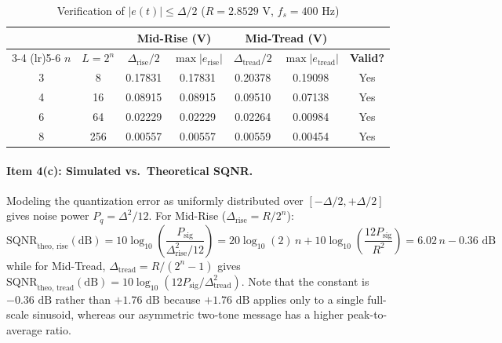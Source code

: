 \documentclass[a4paper]{article}
\begin{document}
\begin{table}[H]
\centering
\caption{Verification of $|e(t)| \le \Delta/2$ ($R = 2.8529\text{ V}$, $f_s = 400\text{ Hz}$)}
\label{tab:digA_item4_bounds}
\small
\setlength{\tabcolsep}{6pt}
\begin{tabular}{c c c c c c c}
\toprule
 & & \multicolumn{2}{c}{\textbf{Mid-Rise (V)}} & \multicolumn{2}{c}{\textbf{Mid-Tread (V)}} & \\
\cmidrule(lr){3-4} \cmidrule(lr){5-6}
\textbf{$n$} & \textbf{$L = 2^n$} & \textbf{$\Delta_{\text{rise}}/2$} & \textbf{$\max|e_{\text{rise}}|$} & \textbf{$\Delta_{\text{tread}}/2$} & \textbf{$\max|e_{\text{tread}}|$} & \textbf{Valid?} \\
\midrule
3 & 8   & 0.17831 & 0.17831 & 0.20378 & 0.19098 & Yes \\
4 & 16  & 0.08915 & 0.08915 & 0.09510 & 0.07138 & Yes \\
6 & 64  & 0.02229 & 0.02229 & 0.02264 & 0.00984 & Yes \\
8 & 256 & 0.00557 & 0.00557 & 0.00559 & 0.00454 & Yes \\
\bottomrule
\end{tabular}
\end{table}

\paragraph{Item 4(c): Simulated vs.\ Theoretical SQNR.}
Modeling the quantization error as uniformly distributed over $[-\Delta/2, +\Delta/2]$ gives noise power $P_q = \Delta^2 / 12$. For Mid-Rise ($\Delta_{\text{rise}} = R/2^n$):
\begin{equation}
\text{SQNR}_{\text{theo, rise}}(\text{dB}) = 10\log_{10}\!\left(\frac{P_{\text{sig}}}{\Delta_{\text{rise}}^2 / 12}\right) = 20\log_{10}(2)\,n + 10\log_{10}\!\left(\frac{12 P_{\text{sig}}}{R^2}\right) = 6.02\,n - 0.36\text{ dB}
\end{equation}
while for Mid-Tread, $\Delta_{\text{tread}} = R/(2^n - 1)$ gives $\text{SQNR}_{\text{theo, tread}}(\text{dB}) = 10\log_{10}(12 P_{\text{sig}} / \Delta_{\text{tread}}^2)$. Note that the constant is $-0.36\text{ dB}$ rather than $+1.76\text{ dB}$ because $+1.76\text{ dB}$ applies only to a single full-scale sinusoid, whereas our asymmetric two-tone message has a higher peak-to-average ratio.
\end{document}

